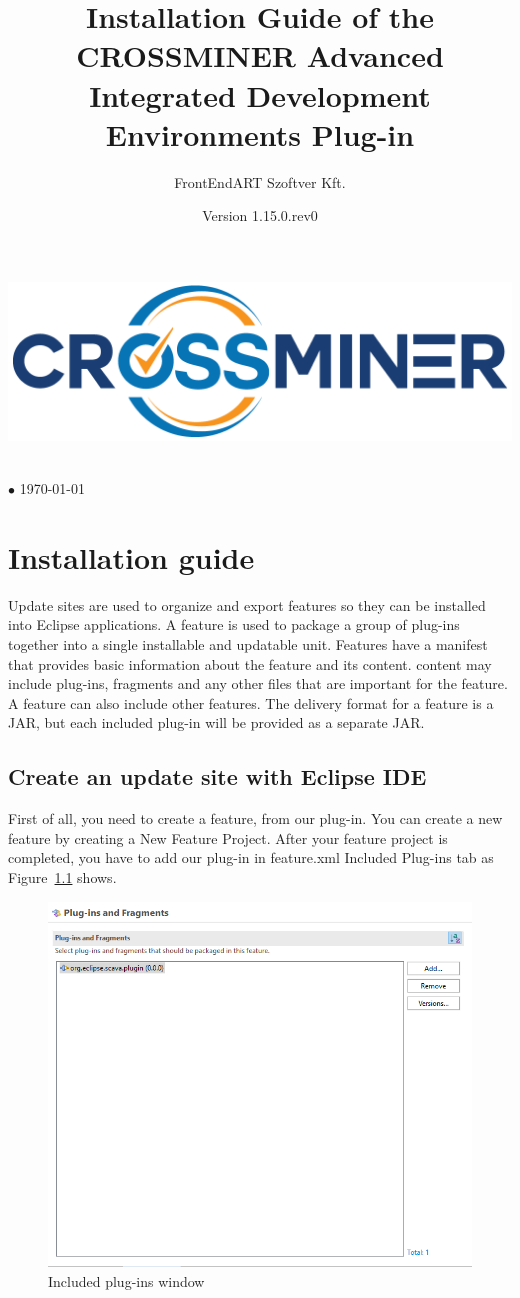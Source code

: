 \documentclass[11pt,a4paper]{book}
\author{FrontEndART Szoftver Kft.}
\title{Installation Guide of the CROSSMINER Advanced Integrated Development Environments Plug-in}
\date{Version 1.15.0.rev0}
\makeatletter
\renewcommand{\maketitle}{
\vspace*{.1\textheight}
\begin{center}
	\includegraphics[width=.6\textwidth]{pic/CROSSMINER-logo-large.png}
\end{center}
\begin{center}
	\Huge\@title
\end{center}
\vfill
\begin{center}
	\large\@author\\\@date{} $\bullet$ \today
\end{center}
}
\makeatother
\begin{document}
	
\begin{titlepage}
	\maketitle
\end{titlepage}

\tableofcontents

\chapter{Installation guide}
Update sites are used to organize and export features so they can be installed into Eclipse applications. A feature is used to package a group of plug-ins together into a single installable and updatable unit. Features have a manifest that provides basic information about the feature and its content. content may include plug-ins, fragments and any other files that are important for the feature. A feature can also include other features. The delivery format for a feature is a JAR, but each included plug-in will be provided as a separate JAR.

\section{Create an update site with Eclipse IDE}

First of all, you need to create a feature, from our plug-in. You can create a new feature by creating a New Feature Project. After your feature project is completed, you have to add our plug-in in feature.xml Included Plug-ins tab as Figure~\ref{fig:feature} shows.

\begin{figure}[!h]
	\centering
	\includegraphics[width=\linewidth]{pic/feature.png}
	\caption{Included plug-ins window}
	\label{fig:feature}
\end{figure}
\end{document}

